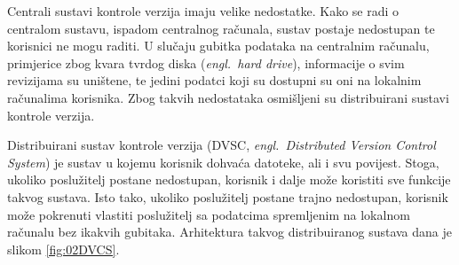 Centrali sustavi kontrole verzija imaju velike nedostatke. Kako se radi o centralom sustavu, ispadom
centralnog računala, sustav postaje nedostupan te korisnici ne mogu raditi. U slučaju gubitka
podataka na centralnim računalu, primjerice zbog kvara tvrdog diska (\textit{engl.~hard drive}),
informacije o svim revizijama su uništene, te jedini podatci koji su dostupni su oni na lokalnim
računalima korisnika. Zbog takvih nedostataka osmišljeni su distribuirani sustavi kontrole verzija.

Distribuirani sustav kontrole verzija (DVSC, \textit{engl.~Distributed Version Control System}) je
sustav u kojemu korisnik dohvaća datoteke, ali i svu povijest. Stoga, ukoliko poslužitelj postane
nedostupan, korisnik i dalje može koristiti sve funkcije takvog sustava. Isto tako, ukoliko
poslužitelj postane trajno nedostupan, korisnik može pokrenuti vlastiti poslužitelj sa podatcima
spremljenim na lokalnom računalu bez ikakvih gubitaka. Arhitektura takvog distribuiranog sustava
dana je slikom \ref{fig:02DVCS}.


